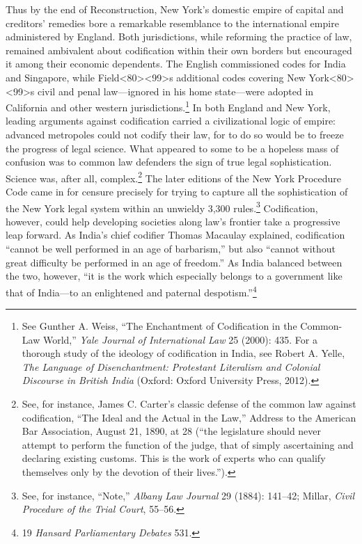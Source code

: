 \documentclass[12pt,]{article}
\let\rmarkdownfootnote\footnote%
\def\footnote{\protect\rmarkdownfootnote}
\begin{document}
Thus by the end of Reconstruction, New York's domestic empire of capital
and creditors' remedies bore a remarkable resemblance to the
international empire administered by England. Both jurisdictions, while
reforming the practice of law, remained ambivalent about codification
within their own borders but encouraged it among their economic
dependents. The English commissioned codes for India and Singapore,
while Field\textless80\textgreater\textless99\textgreater s additional
codes covering New York\textless80\textgreater\textless99\textgreater s
civil and penal law---ignored in his home state---were adopted in
California and other western jurisdictions.\footnote{See Gunther A.
  Weiss, ``The Enchantment of Codification in the Common-Law World,''
  \emph{Yale Journal of International Law} 25 (2000): 435. For a
  thorough study of the ideology of codification in India, see Robert A.
  Yelle, \emph{The Language of Disenchantment: Protestant Literalism and
  Colonial Discourse in British India} (Oxford: Oxford University Press,
  2012).} In both England and New York, leading arguments against
codification carried a civilizational logic of empire: advanced
metropoles could not codify their law, for to do so would be to freeze
the progress of legal science. What appeared to some to be a hopeless
mass of confusion was to common law defenders the sign of true legal
sophistication. Science was, after all, complex.\footnote{See, for
  instance, James C. Carter's classic defense of the common law against
  codification, ``The Ideal and the Actual in the Law,'' Address to the
  American Bar Association, August 21, 1890, at 28 (``the legislature
  should never attempt to perform the function of the judge, that of
  simply ascertaining and declaring existing customs. This is the work
  of experts who can qualify themselves only by the devotion of their
  lives.'').} The later editions of the New York Procedure Code came in
for censure precisely for trying to capture all the sophistication of
the New York legal system within an unwieldy 3,300 rules.\footnote{See,
  for instance, ``Note,'' \emph{Albany Law Journal} 29 (1884): 141--42;
  Millar, \emph{Civil Procedure of the Trial Court}, 55--56.}
Codification, however, could help developing societies along law's
frontier take a progressive leap forward. As India's chief codifier
Thomas Macaulay explained, codification ``cannot be well performed in an
age of barbarism,'' but also ``cannot without great difficulty be
performed in an age of freedom.'' As India balanced between the two,
however, ``it is the work which especially belongs to a government like
that of India---to an enlightened and paternal despotism.''\footnote{19
  \emph{Hansard Parliamentary Debates} 531.}
\end{document}
